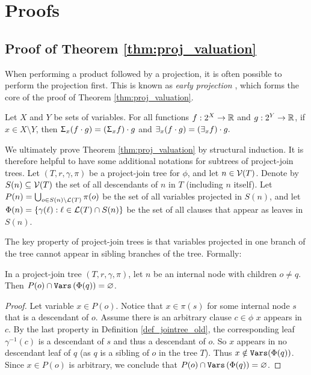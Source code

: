 



\section{Proofs}
\label{appendix:proofs}

\subsection{Proof of Theorem \ref{thm:proj_valuation}}
When performing a product followed by a projection, it is often possible to perform the projection first.
This is known as \emph{early projection} \cite{mcmahan2004projection}, which forms the core of the proof of Theorem \ref{thm:proj_valuation}.
\begin{theorem}
\label{thm:early_projection}
    Let $X$ and $Y$ be sets of variables.
    For all functions $f: 2^X \to \mathbb{R}$ and $g: 2^Y \to \mathbb{R}$, if $x \in X \setminus Y$, then $\Upsigma_x (f \cdot g) = \left( \Upsigma_x f \right) \cdot g$ and $\exists_x (f \cdot g) = \left( \exists_x f \right) \cdot g.$
\end{theorem}

We ultimately prove Theorem \ref{thm:proj_valuation} by structural induction. 
It is therefore helpful to have some additional notations for subtrees of project-join trees.
Let $(T, r, \gamma, \pi)$ be a project-join tree for $\phi$, and let $n \in \mathcal{V}(T)$. Denote by $S(n) \subseteq \mathcal{V}(T)$ the set of all descendants of $n$ in $T$ (including $n$ itself). 
Let $P(n) = \bigcup_{o \in S(n) \setminus \mathcal{L}(T)} \pi(o)$ be the set of all variables projected in $S(n)$, and let $\Phi(n) = \{ \gamma(\ell) : \ell \in \mathcal{L}(T) \cap S(n) \}$ be the set of all clauses that appear as leaves in $S(n)$.

The key property of project-join trees is that variables projected in one branch of the tree cannot appear in sibling branches of the tree. Formally:
\begin{lemma}
\label{lemma:disjoint_P}
    In a project-join tree $(T, r, \gamma, \pi)$, let $n$ be an internal node with children $o \ne q$.
    Then $P(o) \cap \texttt{\upshape Vars} \left( \Phi(q) \right) = \varnothing$.
\end{lemma}
\begin{proof}
    Let variable $x \in P(o)$.
    Notice that $x \in \pi(s)$ for some internal node $s$ that is a descendant of $o$.
    Assume there is an arbitrary clause $c \in \phi$ \st{} $x$ appears in $c$.
    By the last property in Definition \ref{def_jointree_old}, the corresponding leaf $\gamma^{-1}(c)$ is a descendant of $s$ and thus a descendant of $o$.
    So $x$ appears in no descendant leaf of $q$ (as $q$ is a sibling of $o$ in the tree $T$).
    Thus $x \notin \texttt{\upshape Vars}(\Phi(q))$. Since $x \in P(o)$ is arbitrary, we conclude that $P(o) \cap \texttt{\upshape Vars} \left( \Phi(q) \right) = \varnothing$.
\end{proof}

